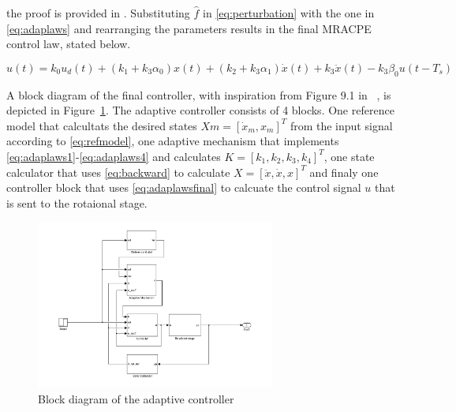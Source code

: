 the proof is provided in \citep{Qingson:2016}. Substituting $\hat{f}$ in \eqref{eq:perturbation} with the one in \eqref{eq:adaplaws} and rearranging the parameters results in the final MRACPE control law, stated below.

\begin{equation}
    \label{eq:adaplawsfinal}
  u(t) = k_0u_d(t) + (k_1 + k_3\alpha_0)x(t) +  (k_2 + k_3\alpha_1)\dot{x}(t) + k_3\ddot{x}(t) - k_3\beta_0u(t-T_s)
\end{equation}

A block diagram of the final controller, with inspiration from Figure 9.1 in ~\citep{Qingson:2016}, is depicted in Figure~\ref{fig:adaptive}. The adaptive controller consists of 4 blocks. One reference model that calcultats the desired states $Xm=[\dot{x}_m, x_m]^T$ from the input signal according to \eqref{eq:refmodel}, one adaptive mechanism that implements \eqref{eq:adaplaws1}-\eqref{eq:adaplaws4} and calculates $K=[k_1, k_2, k_3, k_4]^T$, one state calculator that uses \eqref{eq:backward} to calculate $X=[\ddot{x}, \dot{x}, x]^T$ and finaly one controller block that uses \eqref{eq:adaplawsfinal} to calcuate the control signal $u$ that is sent to the rotaional stage.

\begin{figure}[h]
  \centering %
  \includegraphics[width=0.7\textwidth, trim=4cm 0cm 3.8cm 0cm, clip=true]{fig/matlab/adaptive_scheme}
  \caption{\label{fig:adaptive}Block diagram of the adaptive controller}
\end{figure}

